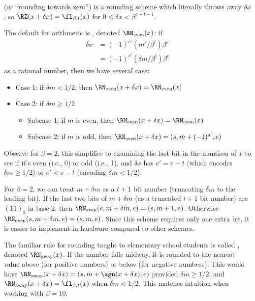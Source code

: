 \begin{defn}
   (or ``rounding towards zero'') is a rounding
  scheme which literally throws away
  $\delta x$, so
  $\RZ(x+\delta x)=\fl_{\beta,t}(x)$ for $0\leq\delta x<\beta^{e-t-1}$.
\end{defn}


\begin{defn}
  The default for  arithmetic is
  ,
  denoted $\RN_{\text{even}}(x)$:
  if
  \begin{equation}
    \begin{split}
      \delta x &= (-1)^{s'}(m'/\beta^{t})\beta^{e'}\\
      &= (-1)^{s'}(\delta m/\beta^{t})\beta^{e}
    \end{split}
  \end{equation}
  as a rational number, then we have several case:
  \begin{itemize}
    \item Case 1: if $\delta m<1/2$, then $\RN_{\text{even}}(x+\delta x)=\RN_{\text{even}}(x)$
    \item Case 2: if $\delta m\geq1/2$
      \begin{itemize}
        \item Subcase 1: if $m$ is even, then $\RN_{\text{even}}(x+\delta x)=\RN_{\text{even}}(x)$
        \item Subcase 2: if $m$ is odd, then $\RN_{\text{even}}(x+\delta x)=(s,m+(-1)^{s'},e)$
      \end{itemize}
  \end{itemize}
  Observe for $\beta=2$, this simplifies to examining the last bit in
  the mantissa of $x$ to see if it's even (i.e., 0) or odd (i.e., 1),
  and $\delta x$ has $e'=e-t$ (which encodes $\delta m\geq1/2$) or
  $e'<e-t$ (encoding $\delta m<1/2$).
\end{defn}

\begin{rmk}
  For $\beta=2$, we can treat $m+\delta m$ as a $t+1$ bit number
  (truncating $\delta m$ to the leading bit). If the last two bits of
  $m+\delta m$ (as a truncated $t+1$ bit number) are
  $(11)_{2}$ in base-2, then $\RN_{\text{even}}(s,m+\delta m,e)=(s,m+1,e)$.
  Otherwise $\RN_{\text{even}}(s,m+\delta m,e)=(s,m,e)$. Since this
  scheme requires only one extra bit, it is easier to implement in
  hardware compared to other schemes.
\end{rmk}
\begin{defn}
  The familiar rule for rounding taught to elementary school students is
  called , denoted $\RN_{\text{away}}(x)$. If the number falls
  midway, it is rounded to the nearest value above (for positive
  numbers) or below (for negative numbers). This would have
  $\RN_{\text{away}}(x+\delta x)=(s,m+\sgn(x+\delta x), e)$ provided $\delta m\geq1/2$;
  and $\RN_{\text{away}}(x+\delta x)=\fl_{\beta,t}(x)$ when $\delta m<1/2$.
  This matches intuition when working with $\beta=10$.
\end{defn}

